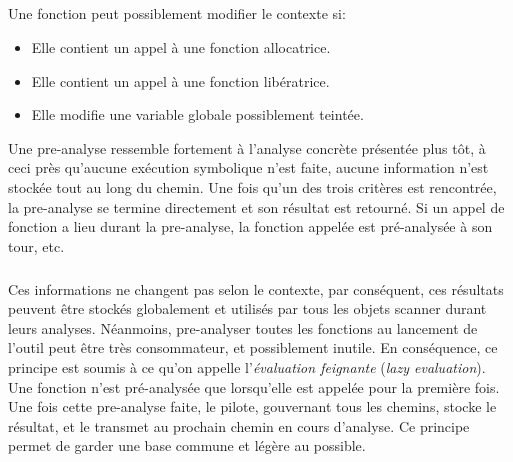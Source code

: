 \subparagraph{}
Une fonction peut possiblement modifier le contexte si:
\begin{itemize}
    \item Elle contient un appel à une fonction allocatrice.
    \item Elle contient un appel à une fonction libératrice.
    \item Elle modifie une variable globale possiblement teintée.
\end{itemize}
Une pre-analyse ressemble fortement à l'analyse concrète présentée plus tôt, à ceci près qu'aucune exécution symbolique n'est faite, aucune information n'est stockée
tout au long du chemin. Une fois qu'un des trois critères est rencontrée, la pre-analyse se termine directement et son résultat est retourné.
Si un appel de fonction a lieu durant la pre-analyse, la fonction appelée est pré-analysée à son tour, etc.
\subparagraph{}
Ces informations ne changent pas selon le contexte, par conséquent, ces résultats peuvent être stockés globalement et utilisés par tous les objets scanner
durant leurs analyses. Néanmoins, pre-analyser toutes les fonctions au lancement de l'outil peut être très consommateur, et possiblement inutile. En conséquence,
ce principe est soumis à ce qu'on appelle l'\textit{évaluation feignante} (\textit{lazy evaluation}). Une fonction n'est pré-analysée que lorsqu'elle est appelée pour la première fois.
Une fois cette pre-analyse faite, le pilote, gouvernant tous les chemins, stocke le résultat, et le transmet au prochain chemin en cours d'analyse. Ce principe permet de garder une base
commune et légère au possible.

